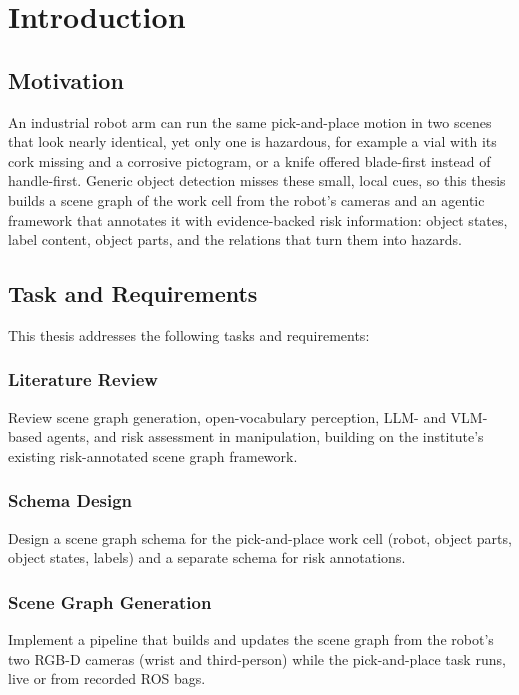 \section{Introduction}

\subsection{Motivation}

An industrial robot arm can run the same pick-and-place motion in two scenes that look nearly identical, yet only one is hazardous, for example a vial with its cork missing and a corrosive pictogram, or a knife offered blade-first instead of handle-first. Generic object detection misses these small, local cues, so this thesis builds a scene graph of the work cell from the robot's cameras and an agentic framework that annotates it with evidence-backed risk information: object states, label content, object parts, and the relations that turn them into hazards.

\subsection{Task and Requirements}

This thesis addresses the following tasks and requirements:

\subsubsection{Literature Review}

Review scene graph generation, open-vocabulary perception, LLM- and VLM-based agents, and risk assessment in manipulation, building on the institute's existing risk-annotated scene graph framework.

\subsubsection{Schema Design}

Design a scene graph schema for the pick-and-place work cell (robot, object parts, object states, labels) and a separate schema for risk annotations.

\subsubsection{Scene Graph Generation}

Implement a pipeline that builds and updates the scene graph from the robot's two RGB-D cameras (wrist and third-person) while the pick-and-place task runs, live or from recorded ROS bags.

